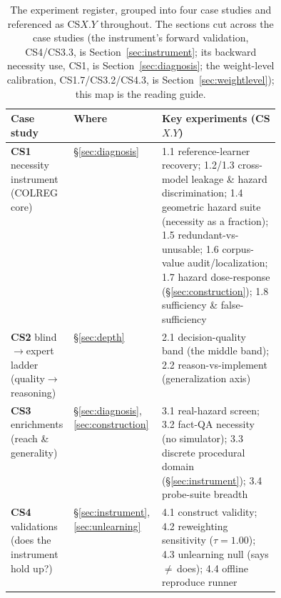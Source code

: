 \documentclass{article}
\begin{document}
\begin{table}[t]
\centering\small
\begin{tabular}{@{}llp{0.44\linewidth}@{}}
\toprule
Case study & Where & Key experiments (CS$X.Y$) \\
\midrule
\textbf{CS1} necessity instrument (COLREG core) & \S\ref{sec:diagnosis} &
1.1 reference-learner recovery; 1.2/1.3 cross-model leakage \& hazard discrimination;
1.4 geometric hazard suite (necessity as a fraction); 1.5 redundant-vs-unusable;
1.6 corpus-value audit/localization; 1.7 hazard dose-response
(\S\ref{sec:construction}); 1.8 sufficiency \& false-sufficiency \\
\addlinespace
\textbf{CS2} blind$\to$expert ladder (quality$\to$reasoning) & \S\ref{sec:depth} &
2.1 decision-quality band (the middle band); 2.2 reason-vs-implement (generalization axis) \\
\addlinespace
\textbf{CS3} enrichments (reach \& generality) & \S\ref{sec:diagnosis},\,\ref{sec:construction} &
3.1 real-hazard screen; 3.2 fact-QA necessity (no simulator); 3.3 discrete procedural domain
(\S\ref{sec:instrument}); 3.4 probe-suite breadth \\
\addlinespace
\textbf{CS4} validations (does the instrument hold up?) & \S\ref{sec:instrument},\,\ref{sec:unlearning} &
4.1 construct validity; 4.2 reweighting sensitivity ($\tau{=}1.00$); 4.3 unlearning null
(says\,$\neq$\,does); 4.4 offline reproduce runner \\
\bottomrule
\end{tabular}
\caption{The experiment register, grouped into four case studies and referenced as CS$X.Y$
throughout. The sections cut across the case studies (the instrument's forward validation, CS4/CS3.3,
is Section~\ref{sec:instrument}; its backward necessity use, CS1, is Section~\ref{sec:diagnosis}; the
weight-level calibration, CS1.7/CS3.2/CS4.3, is Section~\ref{sec:weightlevel}); this map is the
reading guide.}
\label{tab:casemap}
\end{table}
\end{document}
